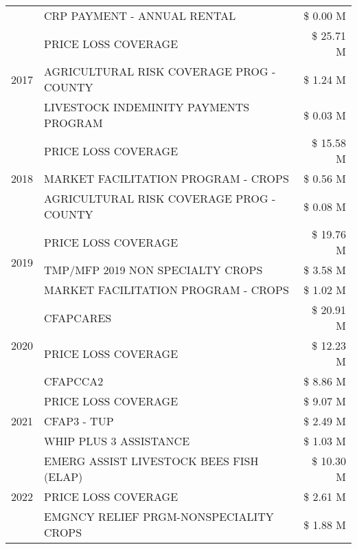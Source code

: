 \begin{tabular}{llr}
 & CRP PAYMENT - ANNUAL RENTAL & \$ 0.00 M \\
\cline{1-3}
\multirow[t]{3}{*}{2017} & PRICE LOSS COVERAGE & \$ 25.71 M \\
 & AGRICULTURAL RISK COVERAGE PROG - COUNTY & \$ 1.24 M \\
 & LIVESTOCK INDEMINITY PAYMENTS PROGRAM & \$ 0.03 M \\
\cline{1-3}
\multirow[t]{3}{*}{2018} & PRICE LOSS COVERAGE & \$ 15.58 M \\
 & MARKET FACILITATION PROGRAM - CROPS & \$ 0.56 M \\
 & AGRICULTURAL RISK COVERAGE PROG - COUNTY & \$ 0.08 M \\
\cline{1-3}
\multirow[t]{3}{*}{2019} & PRICE LOSS COVERAGE & \$ 19.76 M \\
 & TMP/MFP 2019 NON SPECIALTY CROPS & \$ 3.58 M \\
 & MARKET FACILITATION PROGRAM - CROPS & \$ 1.02 M \\
\cline{1-3}
\multirow[t]{3}{*}{2020} & CFAPCARES & \$ 20.91 M \\
 & PRICE LOSS COVERAGE & \$ 12.23 M \\
 & CFAPCCA2 & \$ 8.86 M \\
\cline{1-3}
\multirow[t]{3}{*}{2021} & PRICE LOSS COVERAGE & \$ 9.07 M \\
 & CFAP3 - TUP & \$ 2.49 M \\
 & WHIP PLUS 3 ASSISTANCE & \$ 1.03 M \\
\cline{1-3}
\multirow[t]{3}{*}{2022} & EMERG ASSIST LIVESTOCK BEES FISH (ELAP) & \$ 10.30 M \\
 & PRICE LOSS COVERAGE & \$ 2.61 M \\
 & EMGNCY RELIEF PRGM-NONSPECIALITY CROPS & \$ 1.88 M \\
\cline{1-3}
\bottomrule
\end{tabular}
